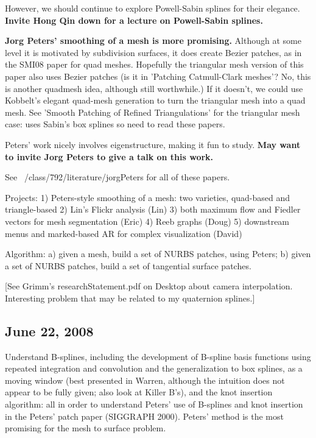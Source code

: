 \documentclass[11pt]{article}
\begin{document}
However, we should continue to explore Powell-Sabin splines for their elegance.
{\bf Invite Hong Qin down for a lecture on Powell-Sabin splines.}

{\bf Jorg Peters' smoothing of a mesh is more promising.}
Although at some level it is motivated by subdivision surfaces,
it does create Bezier patches, as in the SMI08 paper for quad meshes.
Hopefully the triangular mesh version of this paper also uses Bezier patches
(is it in 'Patching Catmull-Clark meshes'? No, this is another quadmesh idea, although
still worthwhile.)
If it doesn't, we could use Kobbelt's elegant quad-mesh generation to turn
the triangular mesh into a quad mesh.
See 'Smooth Patching of Refined Triangulations' for the triangular mesh case:
uses Sabin's box splines so need to read these papers.

Peters' work nicely involves eigenstructure, making it fun to study.
{\bf May want to invite Jorg Peters to give a talk on this work.}

See ~/class/792/literature/jorgPeters for all of these papers.

Projects:
1) Peters-style smoothing of a mesh: two varieties, quad-based and triangle-based
2) Lin's Flickr analysis (Lin)
3) both maximum flow and Fiedler vectors for mesh segmentation (Eric)
4) Reeb graphs (Doug)
5) downstream menus and marked-based AR for complex visualization (David)

Algorithm: 
a) given a mesh, build a set of NURBS patches, using Peters;
b) given a set of NURBS patches, build a set of tangential surface patches.

[See Grimm's researchStatement.pdf on Desktop about camera interpolation.
Interesting problem that may be related to my quaternion splines.]

\subsection{June 22, 2008}

Understand B-splines, including the development of B-spline basis functions using
repeated integration and convolution and the generalization to box splines, 
as a moving window (best presented in Warren,
although the intuition does not appear to be fully given; also look at Killer B's), 
and the knot insertion algorithm: 
all in order to understand Peters' use of B-splines and knot insertion in the Peters'
patch paper (SIGGRAPH 2000).
Peters' method is the most promising for the mesh to surface problem.
\end{document}
